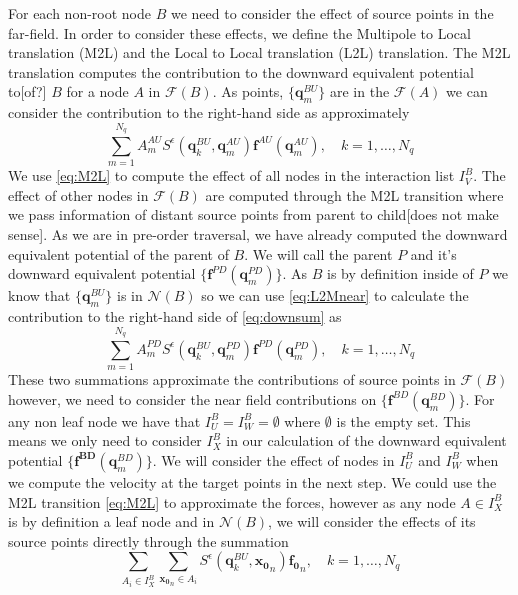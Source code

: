 For each non-root node $B$ we need to consider the effect of source points in the far-field. In order to consider these effects, we define the Multipole to Local translation (M2L) and the Local to Local translation (L2L) translation. The M2L translation computes the contribution to the downward equivalent potential to[of?] $B$ for a node $A$ in $\mathcal{F}(B)$. As points, $\{\bm{q}^{BU}_m\}$ are in the $\mathcal{F}(A)$ we can consider the contribution to the right-hand side as approximately
\begin{equation}
\label{eq:M2L}
\sum_{m=1}^{N_{q}} A_{m}^{A U} S^\epsilon\left(\bm{q}_{k}^{B U}, \bm{q}_{m}^{A U}\right) \bm{f}^{A U}\left(\bm{q}_{m}^{A U}\right), \quad k=1,\dots,N_q
\end{equation}
We use \cref{eq:M2L} to compute the effect of all nodes in the interaction list $I_V^B$. The effect of other nodes in $\mathcal{F}(B)$ are computed through the M2L transition where we pass information of distant source points from parent to child[does not make sense]. As we are in pre-order traversal, we have already computed the downward equivalent potential of the parent of $B$. We will call the parent $P$ and it's downward equivalent potential $\{\bm{f}^{PD}(\bm{q}^{PD}_m)\}$. As $B$ is by definition inside of $P$ we know that $\{\bm{q}^{BU}_m\}$ is in $\mathcal{N}(B)$ so we can use \cref{eq:L2Mnear} to calculate the contribution to the right-hand side of \cref{eq:downsum} as
\begin{equation}
\label{eq:L2L}
\sum_{m=1}^{N_{q}} A_{m}^{P D} S^\epsilon\left(\bm{q}_{k}^{B U}, \bm{q}_{m}^{P D}\right) \bm{f}^{P D}\left(\bm{q}_{m}^{P D}\right), \quad k=1,\dots,N_q
\end{equation}
These two summations approximate the contributions of source points in $\mathcal{F}(B)$ however, we need to consider the near field contributions on $\{\bm{f}^{B D}(\bm{q}^{BD}_m)\}$. For any non leaf node we have that $I_U^B = I_W^B = \emptyset$ where $\emptyset$ is the empty set. This means we only need to consider $I_X^B$ in our calculation of the downward equivalent potential $\{\bm{f^{BD}}(\bm{q}^{BD}_m)\}$. We will consider the effect of nodes in $I_U^B$ and $I_W^B$ when we compute the velocity at the target points in the next step. We could use the M2L transition \cref{eq:M2L} to approximate the forces, however as any node $A \in I_X^B$ is by definition a leaf node and in $\mathcal{N}(B)$, we will consider the effects of its source points directly through the summation
\begin{equation}
\label{eq:X}
    \sum_{A_i \in I_X^B} \sum_{{\bm{x_0}}_n\in A_i} S^\epsilon\left(\bm{q}^{BU}_{k}, {\bm{x_0}}_{n}\right) {\bm{f_0}}_{n}, \quad k=1,\dots,N_q
\end{equation}

